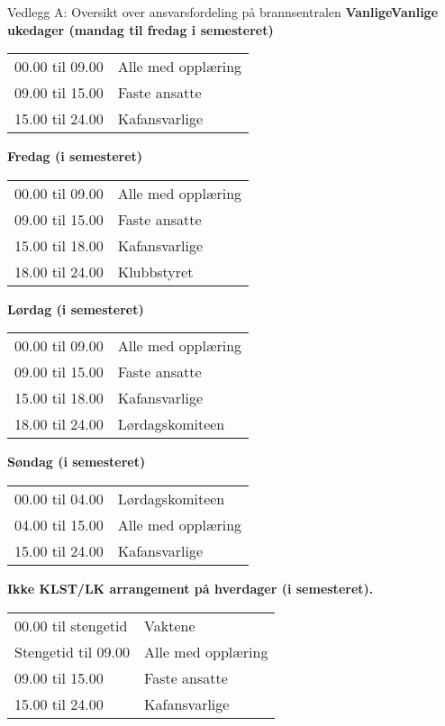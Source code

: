 \begin{instruks}{Vedlegg A: Oversikt over ansvarsfordeling på brannsentralen}{}{}
    \textbf{VanligeVanlige ukedager (mandag til fredag i semesteret)}

    \begin{tabular}{ll}
        00.00 til 09.00 &    Alle med opplæring \\
        09.00 til 15.00 &    Faste ansatte\\
        15.00 til 24.00 &    Kafansvarlige 
    \end{tabular}

    
    \textbf{Fredag (i semesteret)}
    
    \begin{tabular}{ll}
        00.00 til 09.00 &Alle med opplæring \\
        09.00 til 15.00 &Faste ansatte\\
        15.00 til 18.00 &Kafansvarlige\\
        18.00 til 24.00 &Klubbstyret
    \end{tabular}

    
    \textbf{Lørdag (i semesteret)}
    
    
    \begin{tabular}{ll}
        00.00 til 09.00 &Alle med opplæring \\
        09.00 til 15.00 &Faste ansatte\\
        15.00 til 18.00 &Kafansvarlige\\
        18.00 til 24.00 & Lørdagskomiteen
    \end{tabular}

    
    \textbf{Søndag (i semesteret)}
    
    
    \begin{tabular}{ll}
        00.00 til 04.00 &Lørdagskomiteen\\
        04.00 til 15.00 & Alle med opplæring\\
        15.00 til 24.00 & Kafansvarlige
    \end{tabular}

    
    \textbf{Ikke KLST/LK arrangement på hverdager (i semesteret).}
    
    
    \begin{tabular}{ll}
        00.00 til stengetid &    Vaktene\\
        Stengetid til 09.00 &    Alle med opplæring\\
        09.00 til 15.00 &     Faste ansatte \\
        15.00 til 24.00 &     Kafansvarlige
    \end{tabular}


\end{instruks}
